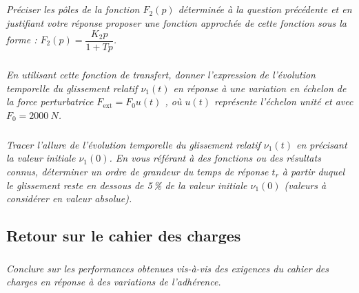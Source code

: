 \documentclass[10pt,fleqn]{article} %
\begin{document}
\begin{multicols}{2}


\subparagraph{}\textit{Préciser les pôles de la fonction $F_2(p)$ déterminée à la question précédente et en justifiant votre réponse proposer une fonction approchée de cette fonction sous
la forme : $F_2(p)=\dfrac{K_2p}{1+Tp}$.}
\ifprof
\begin{corrige}
\end{corrige}
\else
\fi


\subparagraph{}\textit{En utilisant cette fonction de transfert, donner l’expression de l’évolution
temporelle du glissement relatif  $\nu_1(t)$ en réponse à une variation en échelon de
la force perturbatrice $F_{\text{ext}}=F_0u(t)$ , où $u(t)$ représente l’échelon unité et avec
$F_0=\SI{2000}{N}$.}
\ifprof
\begin{corrige}
\end{corrige}
\else
\fi

\subparagraph{}\textit{Tracer l’allure de l’évolution temporelle du glissement relatif $\nu_1(t)$ en précisant
la valeur initiale $\nu_1(0)$. En vous référant à des fonctions ou des résultats
connus, déterminer un ordre de grandeur du temps de réponse $t_r$ à partir
duquel le glissement reste en dessous de 5\,\% de la valeur initiale $\nu_1(0)$ (valeurs
à considérer en valeur absolue).}
\ifprof
\begin{corrige}
\end{corrige}
\else
\fi

\subsection*{Retour sur le cahier des charges}

\subparagraph{}\textit{Conclure sur les performances obtenues vis-à-vis des exigences du cahier des charges en réponse à des variations de l’adhérence.}
\ifprof
\begin{corrige}
\end{corrige}
\else
\fi
\ifprof
\else
\end{multicols}
\fi
\end{document}
